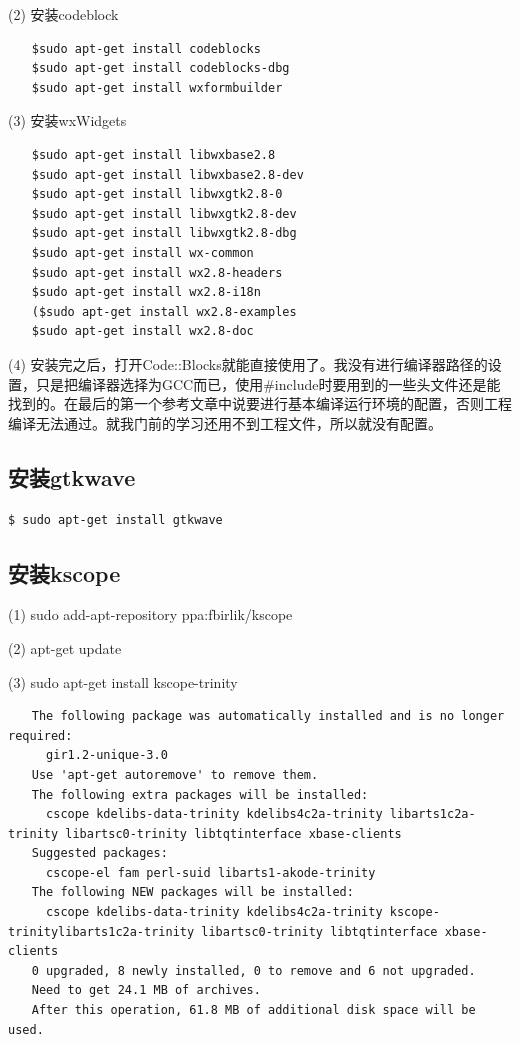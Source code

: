 (2) 安装codeblock
\begin{verbatim}
　　$sudo apt-get install codeblocks
　　$sudo apt-get install codeblocks-dbg
　　$sudo apt-get install wxformbuilder
\end{verbatim}

(3) 安装wxWidgets
\begin{verbatim}
　　$sudo apt-get install libwxbase2.8
　　$sudo apt-get install libwxbase2.8-dev
　　$sudo apt-get install libwxgtk2.8-0
　　$sudo apt-get install libwxgtk2.8-dev
　　$sudo apt-get install libwxgtk2.8-dbg
　　$sudo apt-get install wx-common
　　$sudo apt-get install wx2.8-headers
　　$sudo apt-get install wx2.8-i18n
　　($sudo apt-get install wx2.8-examples
　　$sudo apt-get install wx2.8-doc
\end{verbatim}

(4) 安装完之后，打开Code::Blocks就能直接使用了。我没有进行编译器路径的设置，只是把编译器选择为GCC而已，使用\#include时要用到的一些头文件还是能找到的。在最后的第一个参考文章中说要进行基本编译运行环境的配置，否则工程编译无法通过。就我门前的学习还用不到工程文件，所以就没有配置。

\subsection{安装gtkwave}
\verb"$ sudo apt-get install gtkwave"

\subsection{安装kscope}
(1) sudo add-apt-repository ppa:fbirlik/kscope

(2) apt-get update

(3) sudo apt-get install kscope-trinity
\begin{verbatim}
　　The following package was automatically installed and is no longer required:
　　  gir1.2-unique-3.0
　　Use 'apt-get autoremove' to remove them.
　　The following extra packages will be installed:
　　  cscope kdelibs-data-trinity kdelibs4c2a-trinity libarts1c2a-trinity libartsc0-trinity libtqtinterface xbase-clients
　　Suggested packages:
　　  cscope-el fam perl-suid libarts1-akode-trinity
　　The following NEW packages will be installed:
　　  cscope kdelibs-data-trinity kdelibs4c2a-trinity kscope-trinitylibarts1c2a-trinity libartsc0-trinity libtqtinterface xbase-clients
　　0 upgraded, 8 newly installed, 0 to remove and 6 not upgraded.
　　Need to get 24.1 MB of archives.
　　After this operation, 61.8 MB of additional disk space will be used.
\end{verbatim}

